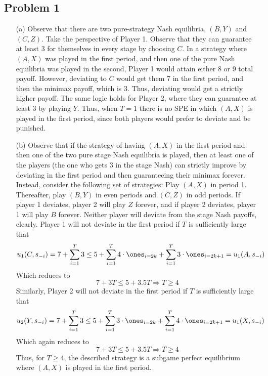 \documentclass[10pt]{article}
\begin{document}
\maketitle

\subsection*{Problem 1}

\begin{itemize}
	\item[(a)] Observe that there are two pure-strategy Nash equilibria, $(B,Y)$ and $(C,Z)$. Take the perspective of Player 1. Observe that they can guarantee at least 3 for themselves in every stage by choosing $C$. In a strategy where $(A,X)$ was played in the first period, and then one of the pure Nash equilibria was played in the second, Player 1 would attain either 8 or 9 total payoff. However, deviating to $C$ would get them 7 in the first period, and then the minimax payoff, which is 3. Thus, deviating would get a strictly higher payoff. The same logic holds for Player 2, where they can guarantee at least 3 by playing $Y$. Thus, when $T=1$ there is no SPE in which $(A,X)$ is played in the first period, since both players would prefer to deviate and be punished.
	
	\item[(b)] Observe that if the strategy of having $(A,X)$ in the first period and then one of the two pure stage Nash equilibria is played, then at least one of the players (the one who gets 3 in the stage Nash) can strictly improve by deviating in the first period and then guaranteeing their minimax forever. Instead, consider the following set of strategies: Play $(A,X)$ in period 1. Thereafter, play $(B,Y)$ in even periods and $(C,Z)$ in odd periods. If player 1 deviates, player 2 will play $Z$ forever, and if player 2 deviates, player 1 will play $B$ forever. Neither player will deviate from the stage Nash payoffs, clearly. Player 1 will not deviate in the first period if $T$ is sufficiently large that \[u_1(C,s_{-i}) = 7 + \sum_{i=1}^T 3 \le 5 + \sum_{i=1}^T 4 \cdot \ones_{i = 2k} + \sum_{i=1}^T 3 \cdot \ones_{i = 2k+1} = u_1(A,s_{-i})\]Which reduces to \[7 + 3T \le 5 + 3.5 T \Longrightarrow T \ge 4\]Similarly, Player 2 will not deviate in the first period if $T$ is sufficiently large that \[u_2(Y,s_{-i}) = 7 + \sum_{i=1}^T 3 \le 5 + \sum_{i=1}^T 3 \cdot \ones_{i = 2k} + \sum_{i=1}^T 4 \cdot \ones_{i = 2k+1} = u_1(X,s_{-i})\]Which again reduces to \[7 + 3T \le 5 + 3.5 T \Longrightarrow T \ge 4\]Thus, for $T \ge 4$, the described strategy is a subgame perfect equilibrium where $(A,X)$ is played in the first period.
\end{itemize}
\end{document}
